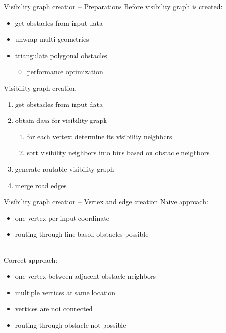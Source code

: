 \documentclass[xcolor={x11names}]{beamer}
\renewcommand{\n}{\hfill\\[0.5ex]}
\newcommand{\nn}{\hfill\\[2ex]}
\begin{document}
		\begin{frame}{Visibility graph creation -- Preparations}
			Before visibility graph is created:\n
			\begin{itemize}
				\item get obstacles from input data
				\item unwrap multi-geometries
				\item triangulate polygonal obstacles
				\begin{itemize}
					\item[\textrightarrow] performance optimization
				\end{itemize}
			\end{itemize}
		\end{frame}
		
		\begin{frame}{Visibility graph creation}
			\begin{enumerate}
				\item get obstacles from input data
				\item obtain data for visibility graph
				\begin{enumerate}
					\item for each vertex: determine its visibility neighbors
					\item sort visibility neighbors into bins based on obstacle neighbors
				\end{enumerate}
				\item generate routable visibility graph
				\item merge road edges
			\end{enumerate}
		\end{frame}
		
		\begin{frame}{Visibility graph creation -- Vertex and edge creation}
			Naive approach:
			\begin{itemize}
				\item one vertex per input coordinate
				\item routing through line-based obstacles possible
			\end{itemize}
			\nn
			\pause
			Correct approach:
			\begin{itemize}
				\item one vertex between adjacent obstacle neighbors
				\item multiple vertices at same location
				\item vertices are not connected
				\item routing through obstacle not possible
			\end{itemize}
		\end{frame}
	
\end{document}

